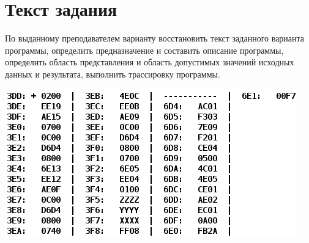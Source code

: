 \documentclass{article}
\begin{document}
\itmo[
  variant=19489,
  labn=4,
  discipline=Основы профессиональной деятельности,
  group=P3115,
  student=Владимир Мацюк,
  teacher=Абузов Ярослав Александрович,
  logo=../../../lib/img/itmo.png
]

\section{Текст задания}
По выданному преподавателем варианту восстановить текст заданного варианта программы, определить предназначение и составить описание программы, определить область представления и область допустимых значений исходных данных и результата, выполнить трассировку программы.
\begin{center}
  \includegraphics[scale=0.8]{task.png}
\end{center}
\end{document}
